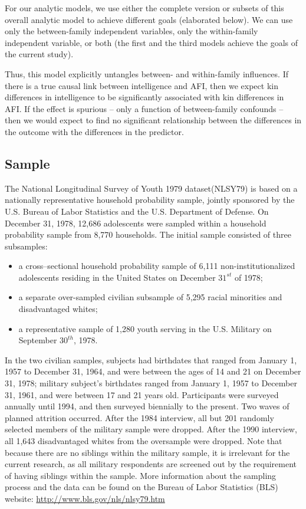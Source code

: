 \documentclass[a4paper,man,apacite,natbib,12pt,longtable]{apa6}\usepackage[]{graphicx}\usepackage[]{color}
\begin{document}
For our analytic models, we use either the complete version or subsets of this overall analytic model to achieve different goals (elaborated below).  We can use only the between-family independent variables, only the within-family independent variable, or both (the first and the third models achieve the goals of the current study).

Thus, this model explicitly untangles between- and within-family influences. If there is a true causal link between intelligence and AFI, then we expect kin differences in intelligence to be significantly associated with kin differences in AFI. If the effect is spurious -- only a function of between-family confounds -- then we would expect to find no significant relationship between the differences in the outcome with the differences in the predictor.
%
\subsection{Sample}
The National Longitudinal Survey of Youth 1979 dataset(NLSY79) is based on a nationally representative household probability sample, jointly sponsored by the U.S. Bureau of Labor Statistics and the U.S. Department of Defense. On December 31, 1978, 12,686 adolescents were sampled within a household probability sample from 8,770 households. The initial sample consisted of three subsamples: \begin{itemize}\item a cross--sectional household probability sample of 6,111 non-institutionalized adolescents residing in the United States on December $31^{st}$ of 1978; \item a separate over-sampled civilian subsample of 5,295 racial minorities and disadvantaged whites; \item a representative sample of 1,280 youth serving in the U.S. Military on September $30^{th}$, 1978.\end{itemize} In the two civilian samples, subjects had birthdates that ranged from January 1, 1957 to December 31, 1964, and were between the ages of 14 and 21 on December 31, 1978; military subject's birthdates ranged from January 1, 1957 to December 31, 1961, and were between 17 and 21 years old. Participants were surveyed annually until 1994, and then surveyed biennially to the present. Two waves of planned attrition occurred. After the 1984 interview, all but 201 randomly selected members of the military sample were dropped. After the 1990 interview, all 1,643 disadvantaged whites from the oversample were dropped. Note that because there are no siblings within the military sample, it is irrelevant for the current research, as all military respondents are screened out by the requirement of having siblings within the sample. More information about the sampling process and the data can be found on the Bureau of Labor Statistics (BLS) website: \url{http://www.bls.gov/nls/nlsy79.htm}
\end{document}
